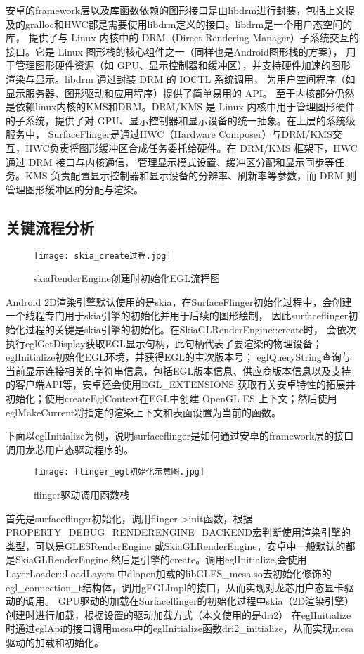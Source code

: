 安卓的framework层以及库函数依赖的图形接口是由libdrm进行封装，包括上文提及的gralloc和HWC都是需要使用libdrm定义的接口。libdrm是一个用户态空间的库，
提供了与 Linux 内核中的 DRM（Direct Rendering Manager）子系统交互的接口。它是 Linux 图形栈的核心组件之一（同样也是Android图形栈的方案），
用于管理图形硬件资源（如 GPU、显示控制器和缓冲区），并支持硬件加速的图形渲染与显示。libdrm 通过封装 DRM 的 IOCTL 系统调用，
为用户空间程序（如显示服务器、图形驱动和应用程序）提供了简单易用的 API。
至于内核部分仍然是依赖linux内核的KMS和DRM。DRM/KMS 是 Linux 内核中用于管理图形硬件的子系统，提供了对 GPU、显示控制器和显示设备的统一抽象。在上层的系统级服务中，
SurfaceFlinger是通过HWC（Hardware Composer）与DRM/KMS交互，HWC负责将图形缓冲区合成任务委托给硬件。在 DRM/KMS 框架下，HWC 通过 DRM 接口与内核通信，
管理显示模式设置、缓冲区分配和显示同步等任务。KMS 负责配置显示控制器和显示设备的分辨率、刷新率等参数，而 DRM 则管理图形缓冲区的分配与渲染。

\subsection{关键流程分析}
\begin{figure}[h]
  \centering
  \texttt{[image: skia\_create过程.jpg]}
  \caption{skiaRenderEngine创建时初始化EGL流程图}
\end{figure}

Android 2D渲染引擎默认使用的是skia，在SurfaceFlinger初始化过程中，会创建一个线程专门用于skia引擎的初始化并用于后续的图形绘制，
因此surfaceflinger初始化过程的关键是skia引擎的初始化。在SkiaGLRenderEngine::create时，
会依次执行eglGetDisplay获取EGL显示句柄，此句柄代表了要渲染的物理设备；eglInitialize初始化EGL环境，并获得EGL的主次版本号；
eglQueryString查询与当前显示连接相关的字符串信息，包括EGL版本信息、供应商版本信息以及支持的客户端API等，安卓还会使用EGL\_EXTENSIONS
获取有关安卓特性的拓展并初始化；使用createEglContext在EGL中创建 OpenGL ES 上下文；然后使用eglMakeCurrent将指定的渲染上下文和表面设置为当前的函数。

下面以eglInitialize为例，说明surfaceflinger是如何通过安卓的framework层的接口调用龙芯用户态驱动程序的。

\begin{figure}[h]
  \centering
  \texttt{[image: flinger\_egl初始化示意图.jpg]}
  \caption{flinger驱动调用函数栈}
\end{figure}

首先是surfaceflinger初始化，调用flinger->init函数，根据PROPERTY\_DEBUG\_RENDERENGINE\_BACKEND宏判断使用渲染引擎的类型，可以是GLESRenderEngine
或SkiaGLRenderEngine，安卓中一般默认的都是SkiaGLRenderEngine,然后是引擎的create。调用eglInitialize,会使用LayerLoader::LoadLayers
中dlopen加载的libGLES\_mesa.so去初始化修饰的egl\_connection\_t结构体，调用gEGLImpl的接口，从而实现对龙芯用户态显卡驱动的调用。
GPU驱动的加载在Surfaceflinger的初始化过程中skia（2D渲染引擎）创建时进行加载，根据设置的驱动加载方式（本文使用的是dri2）
在eglInitialize时通过eglApi的接口调用mesa中的eglInitialize函数dri2\_initialize，从而实现mesa驱动的加载和初始化。

